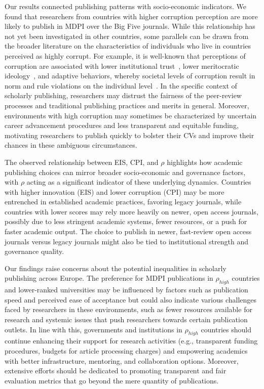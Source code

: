 \documentclass[amsfonts, amssymb, prl, superscriptaddress, notitlepage, twocolumn, nofootinbib]{revtex4-2}
\begin{document}
Our results connected publishing patterns with socio-economic indicators. We found that researchers from countries with higher corruption perception are more likely to publish in MDPI over the Big Five journals. While this relationship has not yet been investigated in other countries, some parallels can be drawn from the broader literature on the characteristics of individuals who live in countries perceived as highly corrupt. For example, it is well-known that perceptions of corruption are associated with lower institutional trust~\cite{hakhverdian2012}, lower meritocratic ideology~\cite{tan2017}, and adaptive behaviors, whereby societal levels of corruption result in norm and rule violations on the individual level~\cite{kobis2018}. In the specific context of scholarly publishing, researchers may distrust the fairness of the peer-review processes and traditional publishing practices and merits in general. Moreover, environments with high corruption may sometimes be characterized by uncertain career advancement procedures and less transparent and equitable funding, motivating researchers to publish quickly to bolster their CVs and improve their chances in these ambiguous circumstances. 

The observed relationship between EIS, CPI, and $\rho$ highlights how academic publishing choices can mirror broader socio-economic and governance factors, with $\rho$ acting as a significant indicator of these underlying dynamics. Countries with higher innovation (EIS) and lower corruption (CPI) may be more entrenched in established academic practices, favoring legacy journals, while countries with lower scores may rely more heavily on newer, open access journals, possibly due to less stringent academic systems, fewer resources, or a push for faster academic output. The choice to publish in newer, fast-review open access journals versus legacy journals might also be tied to institutional strength and governance quality. 

Our findings raise concerns about the potential inequalities in scholarly publishing across Europe. The preference for MDPI publications in $\rho_{high}$ countries and lower-ranked universities may be influenced by factors such as publication speed and perceived ease of acceptance but could also indicate various challenges faced by researchers in these environments, such as fewer resources available for research and systemic issues that push researchers towards certain publication outlets. In line with this, governments and institutions in $\rho_{high}$ countries should continue enhancing their support for research activities (e.g., transparent funding procedures, budgets for article processing charges) and empowering academics with better infrastructure, mentoring, and collaboration options. Moreover, extensive efforts should be dedicated to promoting transparent and fair evaluation metrics that go beyond the mere quantity of publications. 
\end{document}

